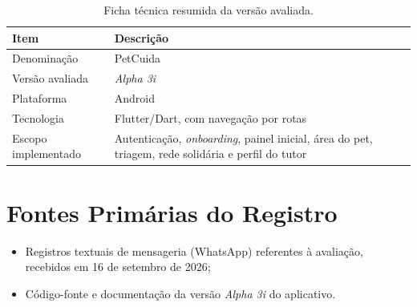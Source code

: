 \documentclass[12pt,a4paper]{article}
\begin{document}
\begin{table}[h!]
\centering
\small
\begin{tabular}{@{}>{\raggedright\arraybackslash}p{4.6cm}>{\raggedright\arraybackslash}p{9.0cm}@{}}
\toprule
\textbf{Item} & \textbf{Descrição} \\
\midrule
Denominação & PetCuida \\
Versão avaliada & \textit{Alpha 3i} \\
Plataforma & Android \\
Tecnologia & Flutter/Dart, com navegação por rotas \\
Escopo implementado & Autenticação, \textit{onboarding}, painel inicial, área do pet, triagem, rede solidária e perfil do tutor \\
\bottomrule
\end{tabular}
\caption{Ficha técnica resumida da versão avaliada.}
\end{table}

\section{Fontes Primárias do Registro}

\begin{itemize}[leftmargin=*]
  \item Registros textuais de mensageria (WhatsApp) referentes à avaliação, recebidos em 16 de setembro de 2026;
  \item Código-fonte e documentação da versão \textit{Alpha 3i} do aplicativo.
\end{itemize}
\end{document}
